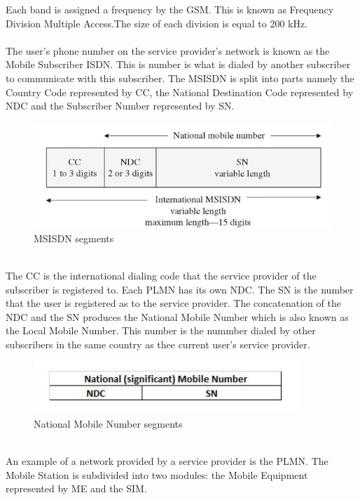Each band is assigned a frequency by the GSM. This is known as Frequency Division Multiple Access.The size of each division is equal to 200 kHz.\\\\
The user's phone number on the service provider's network is known as the Mobile Subscriber ISDN. This is number is what is dialed by another subscriber to communicate with this subscriber. The MSISDN is split into  parts namely the Country Code represented by CC, the National Destination Code represented by NDC and the Subscriber Number represented by SN.\\
\begin{figure}[h]
	\centering
	\includegraphics[scale=0.6]{20}
	\caption{MSISDN segments}
\end{figure}
\\
The CC is the international dialing code that the service provider of the subscriber is registered to. Each PLMN has its own NDC. The SN is the number that the user is registered as to the service provider. The concatenation of the NDC and the SN produces the National Mobile Number which is also known as the Local Mobile Number. This number is the nummber dialed by other subscribers in the same country as thee current user's service provider.\\
\begin{figure}[h]
	\centering
	\includegraphics[scale=0.8]{21}
	\caption{National Mobile Number segments}
\end{figure}
\\
An example of a network provided by a service provider is the PLMN. The Mobile Station is subdivided into two modules: the Mobile Equipment represented by ME and the SIM.
\\
